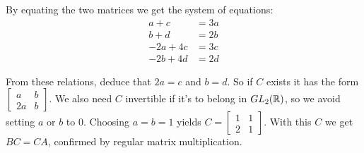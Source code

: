 \documentclass{article}
\begin{document}
By equating the two matrices we get the system of equations:
\begin{align*}
    a + c    & = 3a \\
    b + d    & = 2b \\
    -2a + 4c & = 3c \\
    -2b + 4d & = 2d
\end{align*}

From these relations, deduce that $2a = c$ and $b = d$. So if $C$ exists it has the form $\begin{bmatrix} a & b \\ 2a & b\end{bmatrix}$. We also need $C$ invertible if it's to belong in $GL_2(\mathbb{R})$, so we avoid setting $a$ or $b$ to 0. Choosing $a = b = 1$ yields $C = \begin{bmatrix} 1 & 1 \\ 2 & 1\end{bmatrix}$. With this $C$ we get $BC = CA$, confirmed by regular matrix multiplication.
\end{document}
